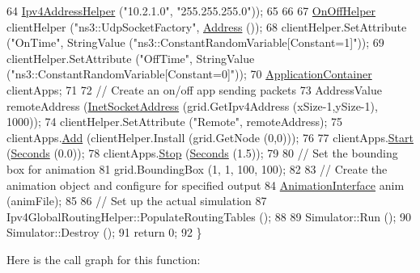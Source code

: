 \begin{DoxyCode}
64                             \hyperlink{classns3_1_1Ipv4AddressHelper}{Ipv4AddressHelper} (\textcolor{stringliteral}{"10.2.1.0"}, \textcolor{stringliteral}{"255.255.255.0"}));
65 
66 
67   \hyperlink{classns3_1_1OnOffHelper}{OnOffHelper} clientHelper (\textcolor{stringliteral}{"ns3::UdpSocketFactory"}, \hyperlink{classns3_1_1Address}{Address} ());
68   clientHelper.SetAttribute (\textcolor{stringliteral}{"OnTime"}, StringValue (\textcolor{stringliteral}{"ns3::ConstantRandomVariable[Constant=1]"}));
69   clientHelper.SetAttribute (\textcolor{stringliteral}{"OffTime"}, StringValue (\textcolor{stringliteral}{"ns3::ConstantRandomVariable[Constant=0]"}));
70   \hyperlink{classns3_1_1ApplicationContainer}{ApplicationContainer} clientApps;
71 
72   \textcolor{comment}{// Create an on/off app sending packets}
73   AddressValue remoteAddress (\hyperlink{classns3_1_1InetSocketAddress}{InetSocketAddress} (grid.GetIpv4Address (xSize-1,ySize-1), 
      1000));
74   clientHelper.SetAttribute (\textcolor{stringliteral}{"Remote"}, remoteAddress);
75   clientApps.\hyperlink{classns3_1_1ApplicationContainer_ad09ab1a1ad5849d518d5f4c262e38152}{Add} (clientHelper.Install (grid.GetNode (0,0)));
76 
77   clientApps.\hyperlink{classns3_1_1ApplicationContainer_a8eff87926507020bbe3e1390358a54a7}{Start} (\hyperlink{group__timecivil_ga33c34b816f8ff6628e33d5c8e9713b9e}{Seconds} (0.0));
78   clientApps.\hyperlink{classns3_1_1ApplicationContainer_adfc52f9aa4020c8714679b00bbb9ddb3}{Stop} (\hyperlink{group__timecivil_ga33c34b816f8ff6628e33d5c8e9713b9e}{Seconds} (1.5));
79 
80   \textcolor{comment}{// Set the bounding box for animation}
81   grid.BoundingBox (1, 1, 100, 100);
82 
83   \textcolor{comment}{// Create the animation object and configure for specified output}
84   \hyperlink{classns3_1_1AnimationInterface}{AnimationInterface} anim (animFile);
85 
86   \textcolor{comment}{// Set up the actual simulation}
87   Ipv4GlobalRoutingHelper::PopulateRoutingTables ();
88 
89   Simulator::Run ();
90   Simulator::Destroy ();
91   \textcolor{keywordflow}{return} 0;
92 \}
\end{DoxyCode}


Here is the call graph for this function\+:


